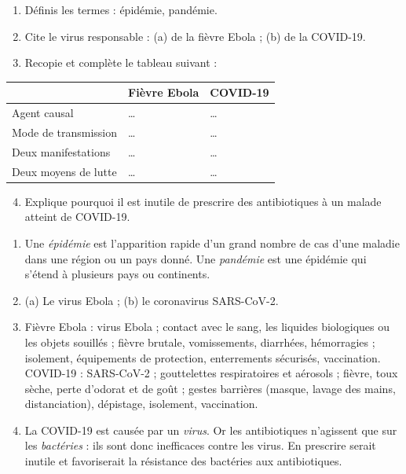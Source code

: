 \documentclass[11pt]{article}
\begin{document}
\begin{exercice}
\begin{enumerate}
\item Définis les termes : épidémie, pandémie.
\item Cite le virus responsable : (a) de la fièvre Ebola ; (b) de la COVID-19.
\item Recopie et complète le tableau suivant :
\end{enumerate}
\begin{center}
\begin{tabularx}{\linewidth}{|l|X|X|}
\hline
\rowcolor{popblueL} & \textbf{Fièvre Ebola} & \textbf{COVID-19} \\
\hline
Agent causal & \ldots & \ldots \\
\hline
Mode de transmission & \ldots & \ldots \\
\hline
Deux manifestations & \ldots & \ldots \\
\hline
Deux moyens de lutte & \ldots & \ldots \\
\hline
\end{tabularx}
\end{center}
\begin{enumerate}
\setcounter{enumi}{3}
\item Explique pourquoi il est inutile de prescrire des antibiotiques à un malade atteint de COVID-19.
\end{enumerate}
\end{exercice}

\begin{corrige}
\begin{enumerate}
\item Une \emph{épidémie} est l'apparition rapide d'un grand nombre de cas d'une maladie dans une région ou un pays donné. Une \emph{pandémie} est une épidémie qui s'étend à plusieurs pays ou continents.
\item (a) Le virus Ebola ; (b) le coronavirus SARS-CoV-2.
\item Fièvre Ebola : virus Ebola ; contact avec le sang, les liquides biologiques ou les objets souillés ; fièvre brutale, vomissements, diarrhées, hémorragies ; isolement, équipements de protection, enterrements sécurisés, vaccination. COVID-19 : SARS-CoV-2 ; gouttelettes respiratoires et aérosols ; fièvre, toux sèche, perte d'odorat et de goût ; gestes barrières (masque, lavage des mains, distanciation), dépistage, isolement, vaccination.
\item La COVID-19 est causée par un \emph{virus}. Or les antibiotiques n'agissent que sur les \emph{bactéries} : ils sont donc inefficaces contre les virus. En prescrire serait inutile et favoriserait la résistance des bactéries aux antibiotiques.
\end{enumerate}
\end{corrige}
\end{document}
